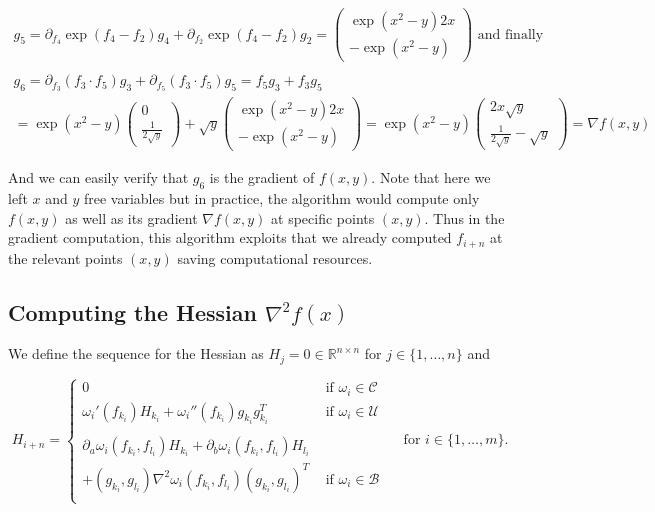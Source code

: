 \documentclass[11pt,a4paper]{article}
\def\R{{\mathbb R}}
\theoremstyle{definition} %
\begin{document}
\begin{gather*}
	g_5 =
	\partial_{f_4} \exp (f_4 - f_2) g_4
	+ \partial_{f_2} \exp (f_4 - f_2) g_2
	= \begin{pmatrix}
		\exp (x^2 - y) 2x \\
		- \exp (x^2 - y)
	\end{pmatrix}
	\text{ and finally } \\ \\
	g_6 =
	\partial_{f_3} ( f_3 \cdot f_5 ) g_3 +
	\partial_{f_5} ( f_3 \cdot f_5 ) g_5
	= f_5 g_3 + f_3 g_5 \\
	=
	\exp (x^2 - y) \begin{pmatrix} 0 \\
		\frac{ 1 }{ 2 \sqrt{y} }
	\end{pmatrix}
	+ \sqrt{y}
	\begin{pmatrix}
		\exp (x^2 - y) 2x \\
		- \exp (x^2 - y)
	\end{pmatrix}
	=
	\exp (x^2 - y)
	\begin{pmatrix}
		2x \sqrt{y} \\
		\frac{ 1 }{ 2 \sqrt{y} } - \sqrt{y}
	\end{pmatrix}
	= \nabla f(x, y)
\end{gather*}

And we can easily verify that $g_6$ is the gradient of $f(x,y)$.
Note that here we left $x$ and $y$ free variables but in practice, the
algorithm would compute only $f(x,y)$ as well as its gradient
$\nabla f(x,y)$ at specific points $(x,y)$. Thus in the gradient computation,
this algorithm exploits that we already computed $f_{i+n}$ at the relevant
points $(x,y)$ saving computational resources.

\subsection{Computing the Hessian $\nabla^2 f(x)$}

We define the sequence for the Hessian as $H_j = 0 \in \R^{n \times n}$
for
$j \in \{
	1, \ldots, n
	\} $ and

\[
	H_{i+n} = \begin{cases}
		0
		 & \text{ if } \omega_i \in \mathcal{C} \\
		\omega_i ' (f_{k_i}) H_{k_i} + \omega_i '' (f_{k_i})
		g_{k_i}
		g_{k_i} ^T
		 & \text{ if } \omega_i \in \mathcal{U} \\ \\
		\partial_a \omega_i (f_{k_i}, f_{l_i}) H_{k_i} +
		\partial_b \omega_i (f_{k_i}, f_{l_i}) H_{l_i}
		 &                                      \\
		+ (g_{k_i}, g_{l_i}) \nabla ^2 \omega_i (f_{k_i}, f_{l_i})
		(g_{k_i}, g_{l_i})^T
		 & \text{ if } \omega_i \in \mathcal{B} \\
	\end{cases}
	\quad \text{ for }
	i \in \{
	1, \ldots, m
	\}.
\]
\end{document}
